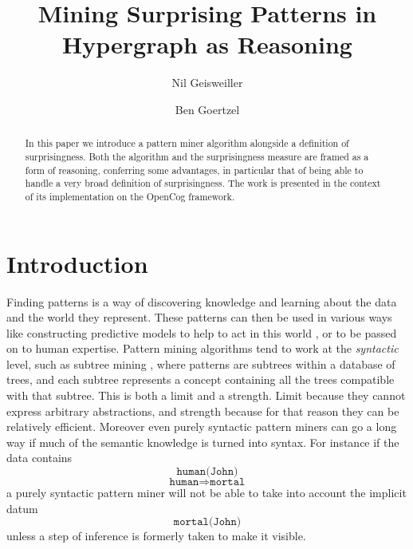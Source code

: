 \documentclass[runningheads]{llncs}
\begin{document}
%
\title{Mining Surprising Patterns in Hypergraph as Reasoning}
%
%
\author{Nil Geisweiller
  \and Ben Goertzel}
%
%
%
\maketitle              %
%

\begin{abstract}
  In this paper we introduce a pattern miner algorithm alongside a
  definition of surprisingness. Both the algorithm and the
  surprisingness measure are framed as a form of reasoning, conferring
  some advantages, in particular that of being able to handle a very
  broad definition of surprisingness. The work is presented in the
  context of its implementation on the OpenCog framework.

\end{abstract}

\section{Introduction}

Finding patterns is a way of discovering knowledge and learning about
the data and the world they represent. These patterns can then be used
in various ways like constructing predictive models to help to act in
this world \cite{Jade12Pat}, or to be passed on to human
expertise. Pattern mining algorithms tend to work at the
\emph{syntactic} level, such as subtree mining \cite{Chi2005Freq},
where patterns are subtrees within a database of trees, and each
subtree represents a concept containing all the trees compatible with
that subtree. This is both a limit and a strength. Limit because they
cannot express arbitrary abstractions, and strength because for that
reason they can be relatively efficient. Moreover even purely
syntactic pattern miners can go a long way if much of the semantic
knowledge is turned into syntax. For instance if the data contains
$$\texttt{human(John)}$$
$$\texttt{human}\Rightarrow\texttt{mortal}$$ a purely syntactic
pattern miner will not be able to take into account the implicit
datum $$\texttt{mortal(John)}$$ unless a step of inference is formerly
taken to make it visible.
\end{document}
